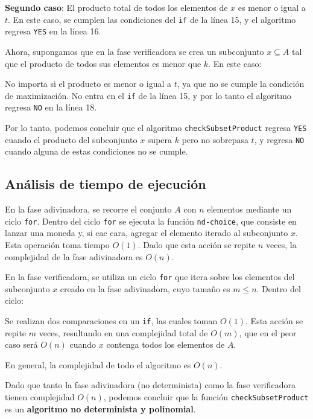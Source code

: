 \documentclass[12pt]{article}
\begin{document}
     \textbf{Segundo caso}: El producto total de todos los elementos de $x$ es menor o igual a $t$. En este caso, se cumplen las condiciones del \texttt{if} de la línea 15, y el algoritmo regresa \texttt{YES} en la línea 16.


Ahora, supongamos que en la fase verificadora se crea un subconjunto $x \subseteq A$ tal que el producto de todos sus elementos es menor que $k$. En este caso:

     No importa si el producto es menor o igual a $t$, ya que no se cumple la condición de maximización.
     No entra en el \texttt{if} de la línea 15, y por lo tanto el algoritmo regresa \texttt{NO} en la línea 18.


Por lo tanto, podemos concluir que el algoritmo \texttt{checkSubsetProduct} regresa \texttt{YES} cuando el producto del subconjunto $x$ supera $k$ pero no sobrepasa $t$, y regresa \texttt{NO} cuando alguna de estas condiciones no se cumple.

\subsection{Análisis de tiempo de ejecución}

En la fase adivinadora, se recorre el conjunto $A$ con $n$ elementos mediante un ciclo \texttt{for}. Dentro del ciclo \texttt{for} se ejecuta la función \texttt{nd-choice}, que consiste en lanzar una moneda y, si cae cara, agregar el elemento iterado al subconjunto $x$. Esta operación toma tiempo $O(1)$. Dado que esta acción se repite $n$ veces, la complejidad de la fase adivinadora es $O(n)$.

En la fase verificadora, se utiliza un ciclo \texttt{for} que itera sobre los elementos del subconjunto $x$ creado en la fase adivinadora, cuyo tamaño es $m \leq n$. Dentro del ciclo:

     Se realizan dos comparaciones en un \texttt{if}, las cuales toman $O(1)$.
     Esta acción se repite $m$ veces, resultando en una complejidad total de $O(m)$, que en el peor caso será $O(n)$ cuando $x$ contenga todos los elementos de $A$.


En general, la complejidad de todo el algoritmo es $O(n)$.

Dado que tanto la fase adivinadora (no determinista) como la fase verificadora tienen complejidad $O(n)$, podemos concluir que la función \texttt{checkSubsetProduct} es un \textbf{algoritmo no determinista y polinomial}.
\end{document}
